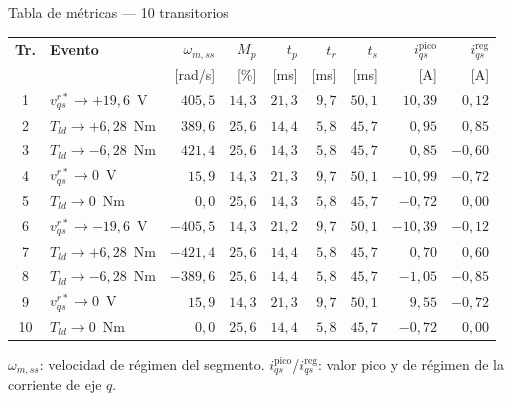 \documentclass[aspectratio=169,t]{beamer}
\begin{document}
\begin{frame}{Tabla de métricas --- 10 transitorios}
\vspace{2mm}

\centering
\scriptsize
\renewcommand{\arraystretch}{1.1}
\begin{tabular}{|c|l|r|r|r|r|r|r|r|}
\hline
\textbf{Tr.} & \textbf{Evento} & $\omega_{m,ss}$ & $M_p$ & $t_p$ & $t_r$ & $t_s$ & $i_{qs}^{\text{pico}}$ & $i_{qs}^{\text{reg}}$ \\
 & & [rad/s] & [\%] & [ms] & [ms] & [ms] & [A] & [A] \\
\hline
1 & $v_{qs}^{r*}\to+19{,}6$~V & $405{,}5$ & $14{,}3$ & $21{,}3$ & $9{,}7$ & $50{,}1$ & $10{,}39$ & $0{,}12$ \\
2 & $T_{ld}\to+6{,}28$~Nm & $389{,}6$ & $25{,}6$ & $14{,}4$ & $5{,}8$ & $45{,}7$ & $0{,}95$ & $0{,}85$ \\
3 & $T_{ld}\to-6{,}28$~Nm & $421{,}4$ & $25{,}6$ & $14{,}3$ & $5{,}8$ & $45{,}7$ & $0{,}85$ & $-0{,}60$ \\
4 & $v_{qs}^{r*}\to 0$~V & $15{,}9$ & $14{,}3$ & $21{,}3$ & $9{,}7$ & $50{,}1$ & $-10{,}99$ & $-0{,}72$ \\
5 & $T_{ld}\to 0$~Nm & $0{,}0$ & $25{,}6$ & $14{,}3$ & $5{,}8$ & $45{,}7$ & $-0{,}72$ & $0{,}00$ \\
6 & $v_{qs}^{r*}\to-19{,}6$~V & $-405{,}5$ & $14{,}3$ & $21{,}2$ & $9{,}7$ & $50{,}1$ & $-10{,}39$ & $-0{,}12$ \\
7 & $T_{ld}\to+6{,}28$~Nm & $-421{,}4$ & $25{,}6$ & $14{,}4$ & $5{,}8$ & $45{,}7$ & $0{,}70$ & $0{,}60$ \\
8 & $T_{ld}\to-6{,}28$~Nm & $-389{,}6$ & $25{,}6$ & $14{,}4$ & $5{,}8$ & $45{,}7$ & $-1{,}05$ & $-0{,}85$ \\
9 & $v_{qs}^{r*}\to 0$~V & $15{,}9$ & $14{,}3$ & $21{,}3$ & $9{,}7$ & $50{,}1$ & $9{,}55$ & $-0{,}72$ \\
10 & $T_{ld}\to 0$~Nm & $0{,}0$ & $25{,}6$ & $14{,}4$ & $5{,}8$ & $45{,}7$ & $-0{,}72$ & $0{,}00$ \\
\hline
\end{tabular}
\normalsize

\vspace{2mm}
{\scriptsize $\omega_{m,ss}$: velocidad de régimen del segmento. $i_{qs}^{\text{pico}}$/$i_{qs}^{\text{reg}}$: valor pico y de régimen de la corriente de eje $q$.}
\end{frame}
\end{document}
